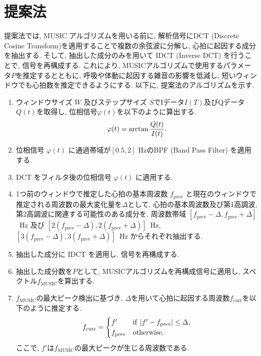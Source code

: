 \documentclass[twocolumn, a4paper]{ieicejsp}
\newcommand{\fmusic}{f_{\mathrm{MUSIC}}}
\newcommand{\fprev}{f_{\mathrm{prev}}}
\newcommand{\fcurr}{f_{\mathrm{curr}}}
\begin{document}
{\section{提案法}
提案法では, MUSIC アルゴリズムを用いる前に, 解析信号にDCT (Discrete Cosine Transform)を適用することで複数の余弦波に分解し, 心拍に起因する成分を抽出する.
そして, 抽出した成分のみを用いて IDCT (Inverse DCT) を行うことで, 信号を再構成する.
これにより, MUSICアルゴリズムで使用するパラメータ$P$を推定するとともに, 呼吸や体動に起因する雑音の影響を低減し, 短いウィンドウでも心拍数を推定できるようにする.
以下に, 提案法のアルゴリズムを示す.
\begin{enumerate}
\item ウィンドウサイズ $W$ 及びステップサイズ $S$でIデータ$I(T)$及びQデータ$Q(t)$を取得し, 位相信号$\varphi(t)$を以下のように算出する.\\
\vspace{-0.5cm}
\begin{eqnarray}
  \varphi(t) = \arctan \frac{Q(t)}{I(t)}.
  \vspace{-0.2cm}
\end{eqnarray}
\vspace{-0.4cm}
\item 位相信号 $\varphi(t)$ に通過帯域が$[0.5,2]$ HzのBPF (Band Pass Filter) を適用する.
\item DCT をフィルタ後の位相信号 $\varphi(t)$ に適用する.
\item 1つ前のウィンドウで推定した心拍の基本周波数 $\fprev$ と現在のウィンドウで推定される周波数の最大変化量を$\Delta$として, 心拍の基本周波数及び第1高調波, 第2高調波に関連する可能性のある成分を, 周波数帯域 $[\fprev-\Delta, \fprev+\Delta]$~Hz 及び $[2(\fprev-\Delta),2(\fprev+\Delta)]$~Hz, $[3(\fprev-\Delta),3(\fprev+\Delta)]$~Hz からそれぞれ抽出する.
\item 抽出した成分に IDCT を適用し, 信号を再構成する.
\item 抽出した成分数を$P$として, MUSICアルゴリズムを再構成信号に適用し, スペクトル$\fmusic$を算出する.
\item $\fmusic$の最大ピーク検出に基づき, $\Delta$を用いて心拍に起因する周波数$\fcurr$を以下のように推定する.
\vspace{-0.1cm}
\begin{eqnarray}
  \fcurr = \begin{cases}
  	f' & {\rm if}~|f'-\fprev| \leq \Delta, \\
	\fprev & {\rm otherwise}.
  \end{cases}
\end{eqnarray}
ここで, $f'$は$\fmusic$の最大ピークが生じる周波数である.
\end{enumerate}

}
\end{document}
